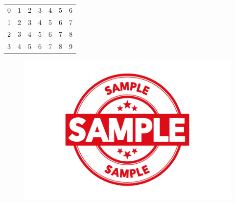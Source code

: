 \documentclass{article}
\begin{document}
\begin{centering}
\begin{tabular}{ccccccc}
0 & 1 & 2 & 3 & 4 & 5 & 6 \\
1 & 2 & 3 & 4 & 5 & 6 & 7 \\
2 & 3 & 4 & 5 & 6 & 7 & 8 \\
3 & 4 & 5 & 6 & 7 & 8 & 9 \\
\end{tabular}
\end{centering}
\begin{figure}[h]
\includegraphics[scale=0.1]{ "hw_2/artifacts/example_image.png" }
\end{figure}
\end{document}
